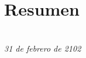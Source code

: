 \chapter*{Resumen}

\begin{flushright}
{\makeatletter\itshape
    \@author \\
    31 de febrero de 2102
\makeatother}
\end{flushright}

